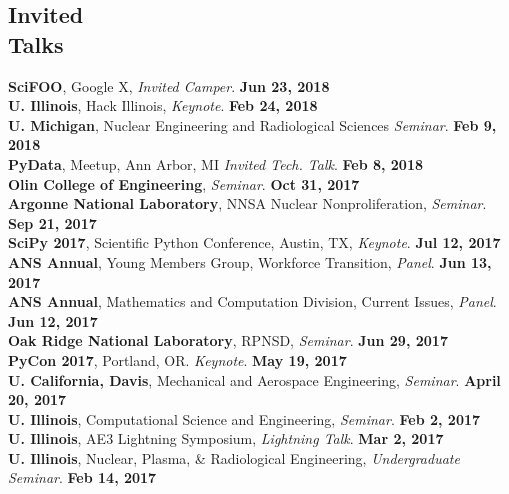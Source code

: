 \documentclass[margin,line]{resume}
\begin{document}
\begin{resume}
    \section{\mysidestyle Invited\\Talks}
      \textbf{SciFOO}, Google X, \emph{Invited Camper}.  \hfill\textbf{Jun 23, 2018}\\
      \textbf{U. Illinois}, Hack Illinois, \emph{Keynote}.  \hfill\textbf{Feb 24, 2018}\\
      \textbf{U. Michigan}, Nuclear Engineering and Radiological Sciences \emph{Seminar}.  \hfill\textbf{Feb 9, 2018}\\
      \textbf{PyData}, Meetup, Ann Arbor, MI \emph{Invited Tech. Talk}.  \hfill\textbf{Feb 8, 2018}\\
      \textbf{Olin College of Engineering}, \emph{Seminar}.  \hfill\textbf{Oct 31, 2017}\\
      \textbf{Argonne National Laboratory}, NNSA Nuclear Nonproliferation, \emph{Seminar}.  \hfill\textbf{Sep 21, 2017}\\
      \textbf{SciPy 2017}, Scientific Python Conference, Austin, TX, \emph{Keynote}.  \hfill\textbf{Jul 12, 2017}\\
      \textbf{ANS Annual}, Young Members Group, Workforce Transition, \emph{Panel}.  \hfill\textbf{Jun 13, 2017}\\
      \textbf{ANS Annual}, Mathematics and Computation Division, Current Issues, \emph{Panel}.  \hfill\textbf{Jun 12, 2017}\\
      \textbf{Oak Ridge National Laboratory}, RPNSD, \emph{Seminar}.  \hfill\textbf{Jun 29, 2017}\\
      \textbf{PyCon 2017}, Portland, OR. \emph{Keynote}.  \hfill\textbf{May 19, 2017}\\
      \textbf{U. California, Davis}, Mechanical and Aerospace Engineering, \emph{Seminar}.  \hfill\textbf{April 20, 2017}\\
      \textbf{U. Illinois}, Computational Science and Engineering, \emph{Seminar}.  \hfill\textbf{Feb 2, 2017}\\
      \textbf{U. Illinois}, AE3 Lightning Symposium, \emph{Lightning Talk}.  \hfill\textbf{Mar 2, 2017}\\
      \textbf{U. Illinois}, Nuclear, Plasma, \& Radiological Engineering, \emph{Undergraduate Seminar}.  \hfill\textbf{Feb 14, 2017}\\

\end{resume}
\end{document}
